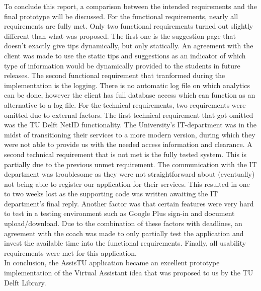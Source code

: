 To conclude this report, a comparison between the intended requirements and the final prototype will be discussed. For the functional requirements, nearly all requirements are fully met. Only two functional requirements turned out slightly different than what was proposed. The first one is the suggestion page that doesn't exactly give tips dynamically, but only statically. An agreement with the client was made to use the static tips and suggestions as an indicator of which type of information would be dynamically provided to the students in future releases. The second functional requirement that tranformed during the implementation is the logging. There is no automatic log file on which analytics can be done, however the client has full database access which can function as an alternative to a log file.
For the technical requirements, two requirements were omitted due to external factors. The first technical requirement that got omitted was the TU Delft NetID functionality. The University's IT-department was in the midst of transitioning their services to a more modern version, during which they were not able to provide us with the needed access information and clearance. A second technical requirement that is not met is the fully tested system. This is partially due to the previous unmet requirement. The communication with the IT department was troublesome as they were not straightforward about (eventually) not being able to register our application for their services. This resulted in one to two weeks lost as the supporting code was written awaiting the IT department's final reply. Another factor was that certain features were very hard to test in a testing environment such as Google Plus sign-in and document upload/download. Due to the combination of these factors with deadlines, an agreement with the coach was made to only partially test the application and invest the available time into the functional requirements.
Finally, all usability requirements were met for this application. \\

In conclusion, the AssisTU application became an excellent prototype implementation of the Virtual Assistant idea that was proposed to us by the TU Delft Library.